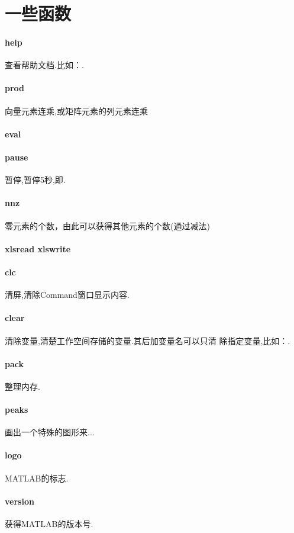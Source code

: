 \section{一些函数}

\paragraph{help} 查看帮助文档.比如：.
\paragraph{prod} 向量元素连乘,或矩阵元素的列元素连乘
\paragraph{eval}
\paragraph{pause} 暂停,暂停5秒,即.
\paragraph{nnz} 零元素的个数，由此可以获得其他元素的个数(通过减法)
\paragraph{xlsread xlswrite}
\paragraph{clc} 清屏,清除Command窗口显示内容.
\paragraph{clear} 清除变量,清楚工作空间存储的变量.其后加变量名可以只清
除指定变量,比如：.
\paragraph{pack} 整理内存.
\paragraph{peaks} 画出一个特殊的图形来...
\paragraph{logo} MATLAB的标志.
\paragraph{version} 获得MATLAB的版本号.
